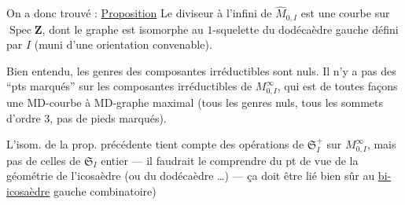 On a donc trouvé :
\uline{Proposition} Le diviseur à l'infini  de $\widehat M_{0,I}$ est une courbe   sur $\operatorname{Spec}\mathbf Z$, dont le graphe est isomorphe au  $1$-squelette du dodécaèdre gauche défini par $I$ (muni d'une orientation convenable).

Bien entendu, les genres des composantes irréductibles sont nuls. Il n'y a pas  des ``pts marqués'' sur  les  composantes irréductibles de $M^\infty_{0,I}$, qui est de toutes façons une MD-courbe  à MD-graphe maximal (tous les genres nuls, tous les sommets d'ordre $3$, pas de pieds marqués).

L'isom. de la prop. précédente tient compte des opérations de $\mathfrak S_I^+$  sur $M^\infty_{0,I}$, mais pas de celles de $\mathfrak S_I$  entier --- il faudrait le comprendre du pt de vue de la géométrie de l'icosaèdre  (ou du dodécaèdre \ldots) --- ça doit être lié bien sûr au \uline{bi-icosaèdre} gauche combinatoire)


